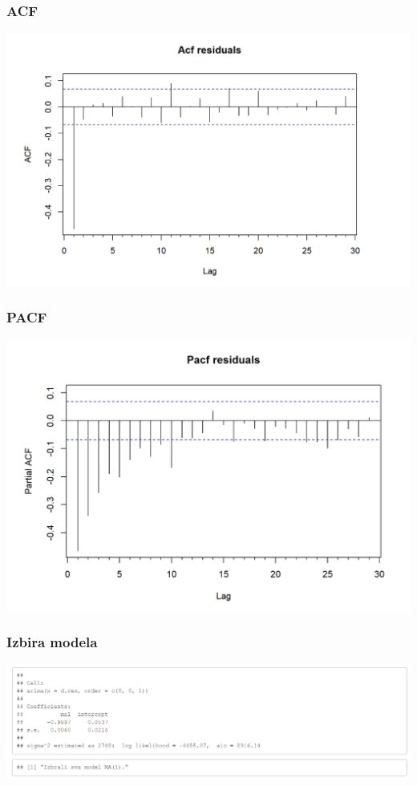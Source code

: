 \documentclass[10pt]{beamer}
\begin{document}
\begin{frame}
\frametitle{ACF}
\includegraphics[width=1\textwidth]{AcfA.png}
\end{frame}

\begin{frame}
\frametitle{PACF}
\includegraphics[width=1\textwidth]{PacfA.png}
\end{frame}

\begin{frame}
\frametitle{Izbira modela}
\includegraphics[width=1\textwidth]{ModelA.png}
\end{frame}
\end{document}
